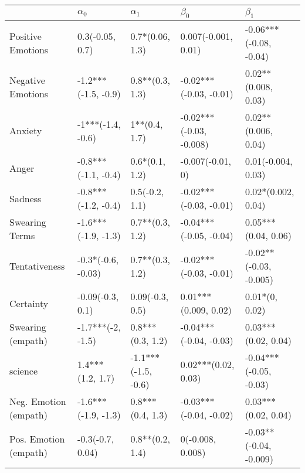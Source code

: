 \begin{tabular}{lllll}
\toprule
{} &           $\alpha_0$ &           $\alpha_1$ &                $\beta_0$ &               $\beta_1$ \\
\midrule
Positive Emotions     &      0.3(-0.05, 0.7) &      0.7*(0.06, 1.3) &      0.007(-0.001, 0.01) &  -0.06***(-0.08, -0.04) \\
Negative Emotions     &  -1.2***(-1.5, -0.9) &      0.8**(0.3, 1.3) &   -0.02***(-0.03, -0.01) &     0.02**(0.008, 0.03) \\
Anxiety               &    -1***(-1.4, -0.6) &        1**(0.4, 1.7) &  -0.02***(-0.03, -0.008) &     0.02**(0.006, 0.04) \\
Anger                 &  -0.8***(-1.1, -0.4) &       0.6*(0.1, 1.2) &         -0.007(-0.01, 0) &      0.01(-0.004, 0.03) \\
Sadness               &  -0.8***(-1.2, -0.4) &       0.5(-0.2, 1.1) &   -0.02***(-0.03, -0.01) &      0.02*(0.002, 0.04) \\
Swearing Terms        &  -1.6***(-1.9, -1.3) &      0.7**(0.3, 1.2) &   -0.04***(-0.05, -0.04) &     0.05***(0.04, 0.06) \\
Tentativeness         &   -0.3*(-0.6, -0.03) &      0.7**(0.3, 1.2) &   -0.02***(-0.03, -0.01) &  -0.02**(-0.03, -0.005) \\
Certainty             &     -0.09(-0.3, 0.1) &      0.09(-0.3, 0.5) &     0.01***(0.009, 0.02) &          0.01*(0, 0.02) \\
Swearing (empath)     &    -1.7***(-2, -1.5) &     0.8***(0.3, 1.2) &   -0.04***(-0.04, -0.03) &     0.03***(0.02, 0.04) \\
science               &     1.4***(1.2, 1.7) &  -1.1***(-1.5, -0.6) &      0.02***(0.02, 0.03) &  -0.04***(-0.05, -0.03) \\
Neg. Emotion (empath) &  -1.6***(-1.9, -1.3) &     0.8***(0.4, 1.3) &   -0.03***(-0.04, -0.02) &     0.03***(0.02, 0.04) \\
Pos. Emotion (empath) &     -0.3(-0.7, 0.04) &      0.8**(0.2, 1.4) &         0(-0.008, 0.008) &  -0.03**(-0.04, -0.009) \\
\bottomrule
\end{tabular}
